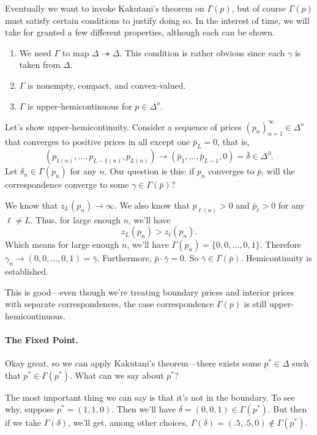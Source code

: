 \documentclass[12pt]{article}
\theoremstyle{definition}
\begin{document}
Eventually we want to invoke Kakutani's theorem on $\Gamma(p)$, but of course $\Gamma(p)$ must satisfy certain conditions to justify doing so. In the interest of time, we will take for granted a few  different properties, although each can be shown. 
\begin{enumerate}
	\item We need $\Gamma$ to map $\Delta \twoheadrightarrow \Delta$. This condition is rather obvious since each $\gamma$ is taken from $\Delta$. 
	\item $\Gamma$ is nonempty, compact, and convex-valued.
	\item $\Gamma$ is upper-hemicontinuous for $p \in \Delta^o$. 
\end{enumerate}
Let's show upper-hemicontinuity. Consider a sequence of prices $(p_n)_{n=1}^{\infty} \in \Delta^o$ that converges to positive prices in all except one $\bar{p}_L=0$, that is,
	\[ \left(p_{1(n)}, \hdots , p_{L-1(n)}, p_{L(n)} \right) \rightarrow  (\bar{p}_1, \hdots , \bar{p}_{L-1}, 0)  = \bar{\delta} \in \Delta^{\partial}.\]
Let $\delta_n \in \Gamma(p_n)$ for any $n$. Our question is this: if $p_n$ converges to $\bar{p}$, will the correspondence converge to some $\gamma \in \Gamma(\bar{p})$?

We know that $z_L(p_n) \rightarrow \infty$. We also know that $p_{\ell(n)}>0$ and $\bar{p}_{\ell}>0$ for any $\ell \neq L$. Thus, for large enough $n$, we'll have 
	\[ z_L(p_n) > z_{\ell}(p_n).	\]
Which means for large enough $n$, we'll have $\Gamma(p_n) = \{0, 0, \hdots, 0, 1\}$. Therefore $\gamma_n \rightarrow (0, 0, \hdots, 0, 1) = \bar{\gamma}$. Furthermore, $\bar{p} \cdot \bar{\gamma} = 0$. So $\bar{\gamma} \in \Gamma(\bar{p})$. Hemicontinuity is established.

This is good---even though we're treating boundary prices and interior prices with separate correspondences, the case correspondence $\Gamma(p)$ is still upper-hemicontinuous.



\paragraph{The Fixed Point.} Okay great, so we can apply Kakutani's theorem---there exists some $p^*\in \Delta$ such that $p^* \in \Gamma(p^*)$. What can we say about $p^*$? 

The most important thing we can say is that it's not in the boundary. To see why, suppose $p^* =(1, 1, 0)$. Then we'll have $\delta = (0, 0, 1) \in \Gamma(p^*)$. But then if we take $\Gamma(\delta)$, we'll get, among other choices, $\Gamma(\delta) = (.5, .5, 0) \notin  \Gamma(p^*)$. 
\end{document}
